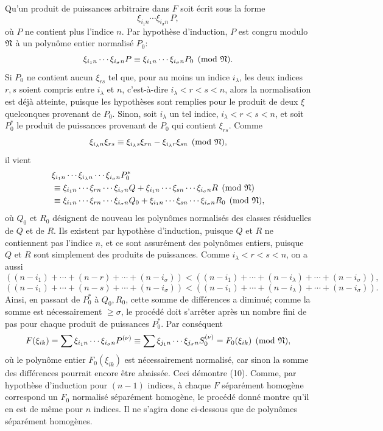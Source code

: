 Qu'un produit de puissances arbitraire dans $F$ soit écrit sous la forme
\[
        \xi_{i_1n}\cdots\xi_{i_\sigma n}\,P,
\]
où $P$ ne contient plus l'indice $n$. Par hypothèse d'induction, $P$ est congru modulo $\mathfrak N$ à un polynôme entier normalisé $P_0$:
\[
        \xi_{i_1n}\cdots\xi_{i_\sigma n}P
        \equiv
        \xi_{i_1n}\cdots\xi_{i_\sigma n}P_0
        \pmod{\mathfrak N}.
\]
Si $P_0$ ne contient aucun $\xi_{rs}$ tel que, pour au moins un indice $i_\lambda$, les deux indices $r,s$ soient compris entre $i_\lambda$ et $n$, c'est-à-dire $i_\lambda<r<s<n$, alors la normalisation est déjà atteinte, puisque les hypothèses sont remplies pour le produit de deux $\xi$ quelconques provenant de $P_0$. Sinon, soit $i_\lambda$ un tel indice, $i_\lambda<r<s<n$, et soit $P_0^*$ le produit de puissances provenant de $P_0$ qui contient $\xi_{rs}$. Comme
\[
        \xi_{i_\lambda n}\xi_{rs}\equiv
        \xi_{i_\lambda s}\xi_{rn}-\xi_{i_\lambda r}\xi_{sn}
        \pmod{\mathfrak N},
\]
il vient
\begin{align*}
 &\xi_{i_1n}\cdots\xi_{i_\lambda n}\cdots\xi_{i_\sigma n}P_0^*\\
 &\equiv
 \xi_{i_1n}\cdots\xi_{rn}\cdots\xi_{i_\sigma n}Q
 +
 \xi_{i_1n}\cdots\xi_{sn}\cdots\xi_{i_\sigma n}R
 \pmod{\mathfrak N}\\
 &\equiv
 \xi_{i_1n}\cdots\xi_{rn}\cdots\xi_{i_\sigma n}Q_0
 +
 \xi_{i_1n}\cdots\xi_{sn}\cdots\xi_{i_\sigma n}R_0
 \pmod{\mathfrak N},
\end{align*}
où $Q_0$ et $R_0$ désignent de nouveau les polynômes normalisés des classes résiduelles de $Q$ et de $R$. Ils existent par hypothèse d'induction, puisque $Q$ et $R$ ne contiennent pas l'indice $n$, et ce sont assurément des polynômes entiers, puisque $Q$ et $R$ sont simplement des produits de puissances. Comme $i_\lambda<r<s<n$, on a aussi
\[
 ((n-i_1)+\cdots+(n-r)+\cdots+(n-i_\sigma))
 <
 ((n-i_1)+\cdots+(n-i_\lambda)+\cdots+(n-i_\sigma)),
\]
\[
 ((n-i_1)+\cdots+(n-s)+\cdots+(n-i_\sigma))
 <
 ((n-i_1)+\cdots+(n-i_\lambda)+\cdots+(n-i_\sigma)).
\]
Ainsi, en passant de $P_0^*$ à $Q_0,R_0$, cette somme de différences a diminué; comme la somme est nécessairement $\ge\sigma$, le procédé doit s'arrêter après un nombre fini de pas pour chaque produit de puissances $P_0^*$. Par conséquent
\[
        F(\xi_{ik})
        =
        \sum \xi_{i_1n}\cdots\xi_{i_\sigma n}P^{(\nu)}
        \equiv
        \sum \xi_{j_1n}\cdots\xi_{j_\sigma n}S_0^{(\nu)}
        =
        F_0(\xi_{ik})\pmod{\mathfrak N},
\]
où le polynôme entier $F_0(\xi_{ik})$ est nécessairement normalisé, car sinon la somme des différences pourrait encore être abaissée. Ceci démontre (10). Comme, par hypothèse d'induction pour $(n-1)$ indices, à chaque $F$ séparément homogène correspond un $F_0$ normalisé séparément homogène, le procédé donné montre qu'il en est de même pour $n$ indices. Il ne s'agira donc ci-dessous que de polynômes séparément homogènes.

